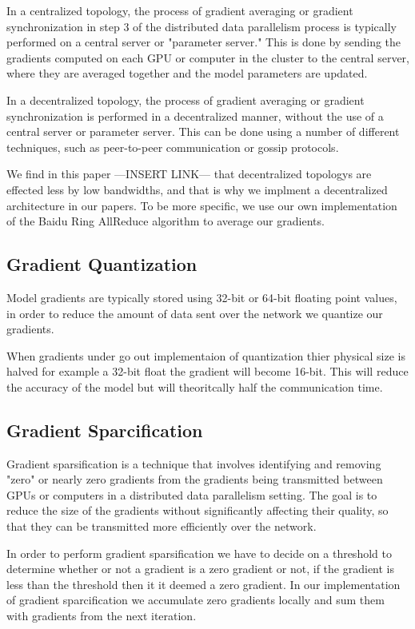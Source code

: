 \documentclass[10pt]{extarticle}
\begin{document}
In a centralized topology, the process of gradient averaging or gradient synchronization in step 3 of the distributed data parallelism process is typically performed on a central server or "parameter server." This is done by sending the gradients computed on each GPU or computer in the cluster to the central server, where they are averaged together and the model parameters are updated.

In a decentralized topology, the process of gradient averaging or gradient synchronization is performed in a decentralized manner, without the use of a central server or parameter server. This can be done using a number of different techniques, such as peer-to-peer communication or gossip protocols.

We find in this paper ---INSERT LINK--- that decentralized topologys are effected less by low bandwidths, and that is why we implment a decentralized architecture in our papers. To be more specific, we use our own implementation of the Baidu Ring AllReduce algorithm to average our gradients.

\subsection*{Gradient Quantization}
Model gradients are typically stored using 32-bit or 64-bit floating point values, in order to reduce the amount of data sent over the network we quantize our gradients.

When gradients under go out implementaion of quantization thier physical size is halved for example a 32-bit float the gradient will become 16-bit. This will reduce the accuracy of the model but will theoritcally half the communication time. 

\subsection*{Gradient Sparcification}
Gradient sparsification is a technique that involves identifying and removing "zero" or nearly zero gradients from the gradients being transmitted between GPUs or computers in a distributed data parallelism setting. The goal is to reduce the size of the gradients without significantly affecting their quality, so that they can be transmitted more efficiently over the network.

In order to perform gradient sparsification we have to decide on a threshold to determine whether or not a gradient is a zero gradient or not, if the gradient is less than the threshold then it it deemed a zero gradient. In our implementation of gradient sparcification we accumulate zero gradients locally and sum them with gradients from the next iteration. 
\end{document}
